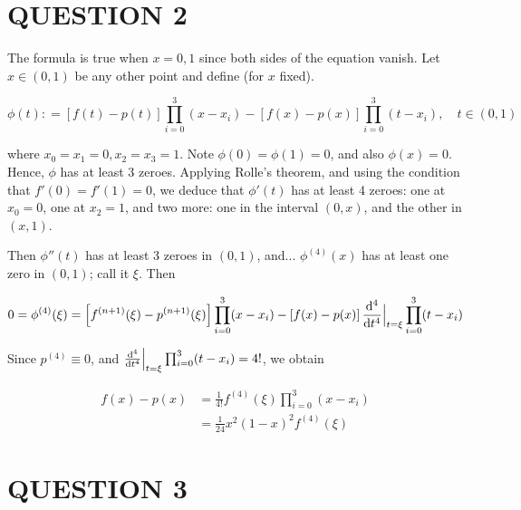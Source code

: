 \documentclass[a4paper]{article}
\begin{document}
\section{QUESTION 2}

The formula is true when $ x = 0,1 $ since both sides of the equation vanish. Let $ x \in (0,1) $ be any other point and define (for $ x $ fixed).

\[ \phi(t): = [f(t) - p(t)] \prod_{i=0}^{3} (x - x_{i}) - [f(x) - p(x)]\prod_{i=0}^{3} (t - x_{i}), \quad t \in (0,1)  \]

where $ x_{0} = x_{1} = 0, x_{2} = x_{3} = 1 $. Note $ \phi(0) = \phi(1) = 0 $, and also $ \phi(x) = 0 $. Hence, $ \phi $ has at least 3 zeroes. Applying Rolle's theorem, and using the condition that $ f'(0) = f'(1) = 0 $, we deduce that $ \phi'(t) $ has at least 4 zeroes: one at $ x_{0} = 0$, one at $ x_{2} = 1 $, and two more: one in the interval $ (0,x) $, and the other in $ (x,1) $.

Then $ \phi''(t) $ has at least 3 zeroes in $ (0,1) $, and... $ \phi^{(4)}(x) $ has at least one zero in $ (0,1) $; call it $ \xi $. Then

\[ 0 = \phi^{(4)}(\xi) = \left[  f^{(n+1)}(\xi) - p^{(n+1)}(\xi) \right] \prod_{i=0}^{3} (x - x_{i}) - \left[ f(x) - p(x) \right] \frac{\mathrm{d}^{4} }{\mathrm{d} t^{4}}\Big|_{t = \xi} \prod_{i=0}^{3} (t - x_{i})    \]

Since $ p^{(4)} \equiv 0 $, and $ \frac{\mathrm{d}^{4} }{\mathrm{d} t^{4}}\Big|_{t = \xi} \prod_{i=0}^{3} (t - x_{i}) = 4! $, we obtain 

\begin{align*}
f(x) - p(x) & = \frac{1}{4!} f^{(4)}(\xi) \prod_{i=0}^{3} (x - x_{i})  \\
& = \frac{1}{24} x^{2}(1-x)^{2} f^{(4)}(\xi) 
\end{align*}

\section{QUESTION 3}

%
%	
%	

\end{document}
